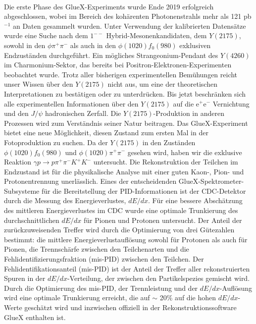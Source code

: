 ~\par Die erste Phase des GlueX-Experiments wurde Ende 2019 erfolgreich abgeschlossen, wobei im Bereich des kohärenten Photonenstrahls mehr als 121 pb$^{-1}$ an Daten gesammelt wurden. Unter Verwendung der kalibrierten Datensätze wurde eine Suche nach dem $1^{--}$ Hybrid-Mesonenkandidaten, dem $Y(2175)$, sowohl in den $\phi\pi^{+}\pi^{-}$ als auch in den $\phi(1020) f_0(980)$ exklusiven Endzuständen durchgeführt. Ein mögliches Strangeonium-Pendant des $Y(4260)$ im Charmonium-Sektor, das bereits bei Positron-Elektronen-Experimenten beobachtet wurde. Trotz aller bisherigen experimentellen Bemühungen reicht unser Wissen über den $Y(2175)$ nicht aus, um eine der theoretischen Interpretationen zu bestätigen oder zu unterdrücken. Bis jetzt beschränken sich alle experimentellen Informationen über den $Y(2175)$ auf die e$^+$e$^{-}$ Vernichtung und den $J/\psi$ hadronischen Zerfall. Die $Y(2175)$-Produktion in anderen Prozessen wird zum Verständnis seiner Natur beitragen. Das GlueX-Experiment bietet eine neue Möglichkeit, diesen Zustand zum ersten Mal in der Fotoproduktion zu suchen. Da der $Y(2175)$ in den Zuständen $\phi(1020)f_{0}(980)$ und $\phi(1020)\pi^{+}\pi^{-}$ gesehen wird, haben wir die exklusive Reaktion $\gamma p \rightarrow p \pi^{+}\pi^{-}K^{+}K^{-}$ untersucht. Die Rekonstruktion der Teilchen im Endzustand ist für die physikalische Analyse mit einer guten Kaon-, Pion- und Protonentrennung unerlässlich. Eines der entscheidenden GlueX-Spektrometer-Subsysteme für die Bereitstellung der PID-Informationen ist der CDC-Detektor durch die Messung des Energieverlustes, $dE/dx$. Für eine bessere Abschätzung des mittleren Energieverlustes im CDC wurde eine optimale Trunkierung des durchschnittlichen $dE/dx$ für Pionen und Protonen untersucht. Der Anteil der zurückzuweisenden Treffer wird durch die Optimierung von drei Gütezahlen bestimmt: die mittlere Energieverlustauflösung sowohl für Protonen als auch für Pionen, die Trennschärfe zwischen den Teilchenarten und die Fehlidentifizierungsfraktion (mis-PID) zwischen den Teilchen. Der Fehlidentifikationsanteil (mis-PID) ist der Anteil der Treffer aller rekonstruierten Spuren in der $dE/dx$-Verteilung, der zwischen den Partikelspezies gemischt wird. Durch die Optimierung des mis-PID, der Trennleistung und der $dE/dx$-Auflösung wird eine optimale Trunkierung erreicht, die auf $\sim$ 20$\%$ auf die hohen $dE/dx$-Werte geschätzt wird und inzwischen offiziell in der Rekonstruktionssoftware GlueX enthalten ist.
